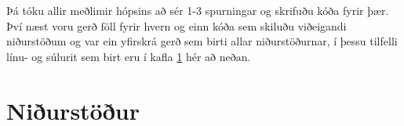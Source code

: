\documentclass[12pt, git, final]{rureport}
\begin{document}
Þá tóku allir meðlimir hópsins að sér 1-3 spurningar og skrifuðu kóða fyrir þær. Því næst voru gerð föll fyrir hvern og einn kóða sem skiluðu viðeigandi niðurstöðum og var ein yfirskrá gerð sem birti allar niðurstöðurnar, í þessu tilfelli línu- og súlurit sem birt eru í kafla \ref{nidurstodur} hér að neðan.



 


\section{Niðurstöður}\label{nidurstodur}
\end{document}
